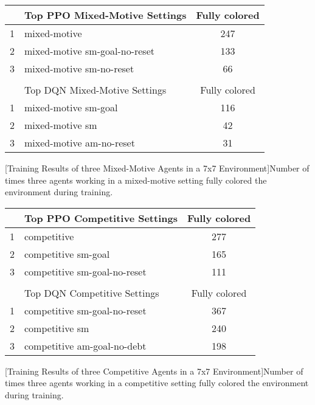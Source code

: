   \begin{center}
    \begin{tabular}{clc}\hline
         & Top PPO Mixed-Motive Settings & Fully colored \\ \hline
        {\small 1} & mixed-motive & 247 \\
        {\small 2} & mixed-motive sm-goal-no-reset & 133 \\
        {\small 3} & mixed-motive sm-no-reset & 66 \\ \hline
         &   \\ \hline
         & Top DQN Mixed-Motive Settings & Fully colored \\ \hline
        {\small 1} & mixed-motive sm-goal & 116 \\
        {\small 2} & mixed-motive sm & 42 \\
        {\small 3} & mixed-motive am-no-reset & 31 \\ \hline
        \end{tabular}
        [Training Results of three Mixed-Motive Agents in a 7x7 Environment]{Number of times three agents working in a mixed-motive setting fully colored the environment during training.}\label{t:2-comp-easy}
    \end{center}

    \begin{center}
    \begin{tabular}{clc}\hline
         & Top PPO Competitive Settings & Fully colored \\ \hline
        {\small 1} & competitive & 277 \\
        {\small 2} & competitive sm-goal & 165 \\
        {\small 3} & competitive sm-goal-no-reset & 111 \\ \hline
         &   \\ \hline
         & Top DQN Competitive Settings & Fully colored \\ \hline
        {\small 1} & competitive sm-goal-no-reset & 367 \\
        {\small 2} & competitive sm & 240 \\
        {\small 3} & competitive am-goal-no-debt & 198 \\ \hline
        \end{tabular}
        [Training Results of three Competitive Agents in a 7x7 Environment]{Number of times three agents working in a competitive setting fully colored the environment during training.}\label{t:2-comp-easy}
    \end{center}